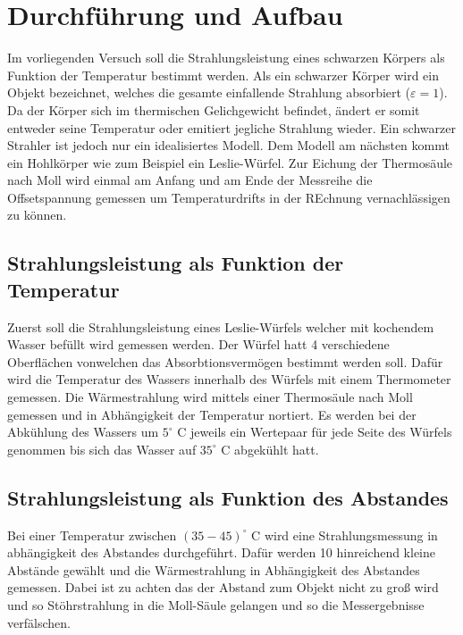 \section{Durchführung und Aufbau}
\label{sec:Durchführung}
Im vorliegenden Versuch soll die Strahlungsleistung eines schwarzen Körpers als Funktion der Temperatur bestimmt werden. Als ein schwarzer Körper wird ein Objekt bezeichnet, welches die gesamte einfallende Strahlung absorbiert ($\varepsilon = 1$). Da der Körper sich im thermischen Gelichgewicht befindet, ändert er somit entweder seine Temperatur oder emitiert jegliche Strahlung wieder. Ein schwarzer Strahler ist jedoch nur ein idealisiertes Modell. Dem Modell am nächsten kommt ein Hohlkörper wie zum Beispiel ein Leslie-Würfel. Zur Eichung der Thermosäule nach Moll wird einmal am Anfang und am Ende der Messreihe die Offsetspannung gemessen um Temperaturdrifts in der REchnung vernachlässigen zu können.
\subsection{Strahlungsleistung als Funktion der Temperatur}
Zuerst soll die Strahlungsleistung eines Leslie-Würfels welcher mit kochendem Wasser befüllt wird gemessen werden. Der Würfel hatt 4 verschiedene Oberflächen vonwelchen das Absorbtionsvermögen bestimmt werden soll. Dafür wird die Temperatur des Wassers innerhalb des Würfels mit einem Thermometer gemessen. Die Wärmestrahlung wird mittels einer Thermosäule nach Moll gemessen und in Abhängigkeit der Temperatur nortiert. Es werden bei der Abkühlung des Wassers um $5^\circ$ C jeweils ein Wertepaar für jede Seite des Würfels genommen bis sich das Wasser auf $35^\circ$ C abgekühlt hatt.
\subsection{Strahlungsleistung als Funktion des Abstandes}
Bei einer Temperatur zwischen $(35 - 45) ^\circ$ C wird eine Strahlungsmessung in abhängigkeit des Abstandes durchgeführt. Dafür werden 10 hinreichend kleine Abstände gewählt und die Wärmestrahlung in Abhängigkeit des Abstandes gemessen. Dabei ist zu achten das der Abstand zum Objekt nicht zu groß wird und so Stöhrstrahlung in die Moll-Säule gelangen und so die Messergebnisse verfälschen. 
